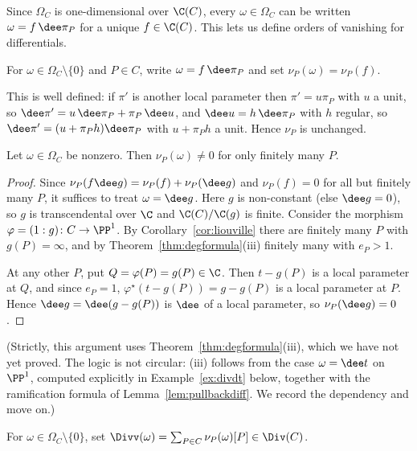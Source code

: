 Since $\Omega_C$ is one-dimensional over $\C(C)$, every $\omega \in \Omega_C$ can be written $\omega = f\,\dee\pi_P$ for a unique $f \in \C(C)$. This lets us define orders of vanishing for differentials.

\begin{definition}
	For $\omega \in \Omega_C\setminus\{0\}$ and $P \in C$, write $\omega = f\,\dee\pi_P$ and set $\nu_P(\omega) = \nu_P(f)$.
\end{definition}

This is well defined: if $\pi'$ is another local parameter then $\pi' = u\pi_P$ with $u$ a unit, so $\dee\pi' = u\,\dee\pi_P + \pi_P\,\dee u$, and $\dee u = h\,\dee\pi_P$ with $h$ regular, so $\dee\pi' = (u + \pi_Ph)\dee\pi_P$ with $u + \pi_Ph$ a unit. Hence $\nu_P$ is unchanged.

\begin{lemma}\label{lem:omegafinite}
	Let $\omega \in \Omega_C$ be nonzero. Then $\nu_P(\omega)\neq 0$ for only finitely many $P$.
\end{lemma}

\begin{proof}
	Since $\nu_P(f\dee g) = \nu_P(f) + \nu_P(\dee g)$ and $\nu_P(f) = 0$ for all but finitely many $P$, it suffices to treat $\omega = \dee g$. Here $g$ is non-constant (else $\dee g = 0$), so $g$ is transcendental over $\C$ and $\C(C)/\C(g)$ is finite. Consider the morphism $\varphi = (1:g)\colon C \to \PP^1$. By Corollary~\ref{cor:liouville} there are finitely many $P$ with $g(P) = \infty$, and by Theorem~\ref{thm:degformula}(iii) finitely many with $e_P > 1$.

	At any other $P$, put $Q = \varphi(P) = g(P) \in \C$. Then $t - g(P)$ is a local parameter at $Q$, and since $e_P = 1$, $\varphi^\star(t - g(P)) = g - g(P)$ is a local parameter at $P$. Hence $\dee g = \dee(g - g(P))$ is $\dee$ of a local parameter, so $\nu_P(\dee g) = 0$.
\end{proof}

(Strictly, this argument uses Theorem~\ref{thm:degformula}(iii), which we have not yet proved. The logic is not circular: (iii) follows from the case $\omega = \dee t$ on $\PP^1$, computed explicitly in Example~\ref{ex:divdt} below, together with the ramification formula of Lemma~\ref{lem:pullbackdiff}. We record the dependency and move on.)

\begin{definition}
	For $\omega \in \Omega_C\setminus\{0\}$, set $\Divv(\omega) = \sum_{P\in C}\nu_P(\omega)[P] \in \Div(C)$.
\end{definition}

